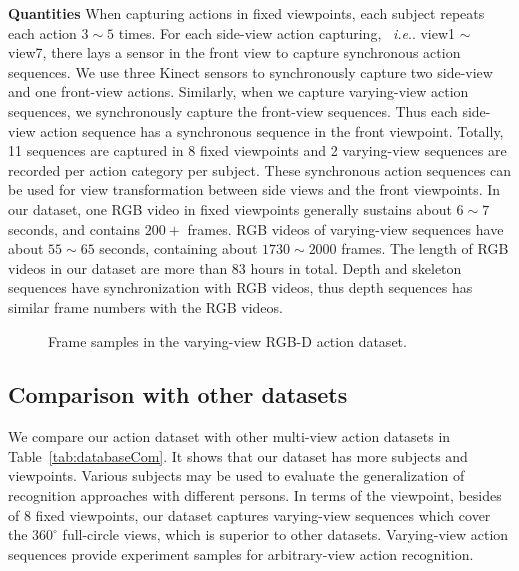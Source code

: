 \documentclass[journal]{IEEEtran}
\makeatletter
\DeclareRobustCommand\onedot{\futurelet\@let@token\@onedot}
\def\@onedot{\ifx\@let@token.\else.\null\fi\xspace}
\def\ie{\emph{i.e}\onedot} \def\Ie{\emph{I.e}\onedot}
\makeatother
\begin{document}
\textbf{Quantities} When capturing actions in fixed viewpoints, each subject repeats each action $3 \sim 5$ times. For each side-view action capturing, ~\ie view1 $\sim$ view7, there lays a sensor in the front view to capture synchronous action sequences. We use three Kinect sensors to synchronously capture two side-view and one front-view actions. Similarly, when we capture varying-view action sequences, we synchronously capture the front-view sequences. Thus each side-view action sequence has a synchronous sequence in the front viewpoint. Totally, 11 sequences are captured in 8 fixed viewpoints and 2 varying-view sequences are recorded per action category per subject. These synchronous action sequences can be used for view transformation between side views and the front viewpoints. In our dataset, one RGB video in fixed viewpoints generally sustains about $6 \sim 7$ seconds, and contains $200+$ frames. RGB videos of varying-view sequences have about $55 \sim 65$ seconds, containing about $1730 \sim 2000$ frames. The length of RGB videos in our dataset are more than 83 hours in total. Depth and skeleton sequences have synchronization with RGB videos, thus depth sequences has similar frame numbers with the RGB videos.
\begin{figure*}
 \begin{center}
 \hspace{1in}
 \caption{ Frame samples in the varying-view RGB-D action dataset. }
 \label{fig:DBexample} \end{center}
 \end{figure*}

\subsection{Comparison with other datasets}
We compare our action dataset with other multi-view action datasets in Table~\ref{tab:databaseCom}. It shows that our dataset has more subjects and viewpoints. Various subjects may be used to evaluate the generalization of recognition approaches with different persons. In terms of the viewpoint, besides of 8 fixed viewpoints, our dataset captures varying-view sequences which cover the $360^\circ$ full-circle views, which is superior to other datasets. Varying-view action sequences provide experiment samples for arbitrary-view action recognition.
\end{document}
